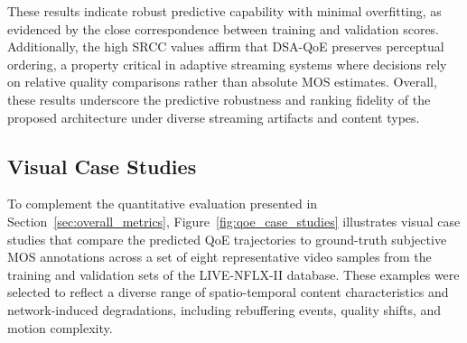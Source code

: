 These results indicate robust predictive capability with minimal overfitting, as evidenced by the close correspondence between training and validation scores. 
Additionally, the high SRCC values affirm that DSA-QoE preserves perceptual ordering, a property critical in adaptive streaming systems where decisions rely on 
relative quality comparisons rather than absolute MOS estimates. Overall, these results underscore the predictive robustness and ranking fidelity of the proposed 
architecture under diverse streaming artifacts and content types.

\subsection{Visual Case Studies}
\label{sec:visual_case_studies}

To complement the quantitative evaluation presented in Section~\ref{sec:overall_metrics}, Figure~\ref{fig:qoe_case_studies} illustrates visual case studies that compare the predicted QoE trajectories to ground-truth subjective MOS annotations across a set of eight representative video samples from the training and validation sets of the LIVE-NFLX-II database. These examples were selected to reflect a diverse range of spatio-temporal content characteristics and network-induced degradations, including rebuffering events, quality shifts, and motion complexity.


